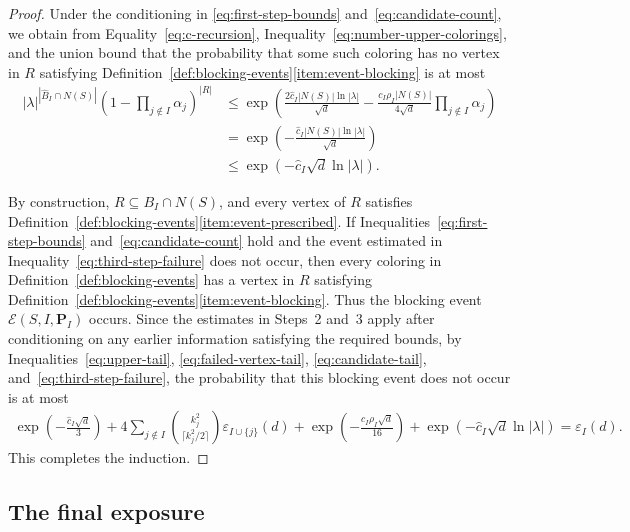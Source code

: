 \documentclass[10pt,a4paper]{amsart}
\numberwithin{equation}{section}
\begin{document}
\begin{proof}
Under the conditioning in \eqref{eq:first-step-bounds}
and~\eqref{eq:candidate-count}, we obtain from
Equality~\eqref{eq:c-recursion}, Inequality~\eqref{eq:number-upper-colorings},
and the union bound that the probability that some such coloring has no
vertex in $R$ satisfying
Definition~\ref{def:blocking-events}\ref{item:event-blocking} is at most
\begin{equation}\label{eq:third-step-failure}
\begin{aligned}
|\lambda|^{|\hat{B}_{I} \cap N(S)|}
\left(1 - \prod_{j \notin I}\alpha_j\right)^{|R|}
 & \leq \exp\left(
 \frac{2\hat{c}_{I}|N(S)|\ln |\lambda|}{\sqrt{d}}
 -\frac{c_I\rho_I|N(S)|}{4\sqrt{d}}
 \prod_{j \notin I}\alpha_j
 \right) \\
 & = \exp\left(
 -\frac{\hat{c}_{I}|N(S)|\ln |\lambda|}{\sqrt{d}}
 \right)\\
 & \leq
 \exp\left(-\hat{c}_{I}\sqrt{d}\ln |\lambda|\right).
\end{aligned}
\end{equation}

By construction, $R \subseteq B_I \cap N(S)$, and every vertex of $R$
satisfies Definition~\ref{def:blocking-events}\ref{item:event-prescribed}.
If Inequalities~\eqref{eq:first-step-bounds} and~\eqref{eq:candidate-count}
hold and the event estimated in Inequality~\eqref{eq:third-step-failure} does
not occur, then every coloring in Definition~\ref{def:blocking-events} has a
vertex in $R$ satisfying
Definition~\ref{def:blocking-events}\ref{item:event-blocking}. Thus the
blocking event $\mathcal{E}(S,I,\mathbf{P}_I)$ occurs. Since the estimates in
Steps~2 and~3 apply after conditioning on any earlier information satisfying
the required bounds,
by Inequalities~\eqref{eq:upper-tail}, \eqref{eq:failed-vertex-tail},
\eqref{eq:candidate-tail}, and~\eqref{eq:third-step-failure}, the probability
that this blocking event does not occur is at most
\begin{align*}
 \exp\left(-\frac{\hat{c}_{I}\sqrt{d}}{3}\right)
 +4\sum_{j \notin I}
 \binom{k_j^2}{\lceil k_j^2/2\rceil}
 \varepsilon_{I \cup \{j\}}(d)
 +\exp\left(-\frac{c_I\rho_I\sqrt{d}}{16}\right)
 +\exp\left(-\hat{c}_{I}\sqrt{d}\ln |\lambda|\right)
 = \varepsilon_I(d).
\end{align*}
This completes the induction.
\end{proof}

\subsection{The final exposure}
\label{subsec:final-exposure}
\end{document}
